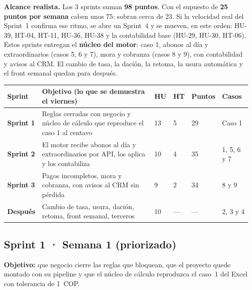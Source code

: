 \documentclass[11pt,a4paper]{article}
\begin{document}
\begin{tcolorbox}[colback=white,colframe=alerta,boxrule=0.4pt,arc=2pt]
\small\textbf{Alcance realista.} Los 3 sprints suman \textbf{98 puntos}. Con el supuesto de
\textbf{25 puntos por semana} caben unos 75: sobran cerca de 23. Si la velocidad real del Sprint~1
confirma ese ritmo, se abre un Sprint~4 y se mueven, en este orden: HU-39, HT-04, HT-11, HU-36,
HU-38 y la contabilidad base (HU-29, HU-30, HT-06).
Estos sprints entregan el \textbf{núcleo del motor}: caso 1, abonos al día y extraordinarios
(casos 5, 6 y 7), mora y cobranza (casos 8 y 9), con contabilidad y avisos al CRM. El cambio de tasa,
la dación, la retoma, la usura automática y el front semanal quedan para después.
\end{tcolorbox}

\begin{longtable}{>{\bfseries}p{1.4cm} p{6.4cm} p{1.2cm} p{1.2cm} p{1.2cm} p{2.6cm}}
\toprule
Sprint & Objetivo (lo que se demuestra el viernes) & HU & HT & Puntos & Casos \\
\midrule
\endhead
Sprint 1 & Reglas cerradas con negocio y núcleo de cálculo que reproduce el caso 1 al centavo & 13 & 5 & 29 & Caso 1 \\
Sprint 2 & El motor recibe abonos al día y extraordinarios por API, los aplica y los contabiliza & 10 & 4 & 35 & 1, 5, 6 y 7 \\
Sprint 3 & Pagos incompletos, mora y cobranza, con avisos al CRM sin pérdida & 9 & 2 & 34 & 8 y 9 \\
Después & Cambio de tasa, usura, dación, retoma, front semanal, terceros & 10 & — & — & 2, 3 y 4 \\
\bottomrule
\end{longtable}

\subsection{Sprint 1 · Semana 1 (priorizado)}

\noindent\textbf{Objetivo:} que negocio cierre las reglas que bloquean, que el proyecto quede
montado con su pipeline y que el núcleo de cálculo reproduzca el caso~1 del Excel con tolerancia de 1~COP.
\end{document}
